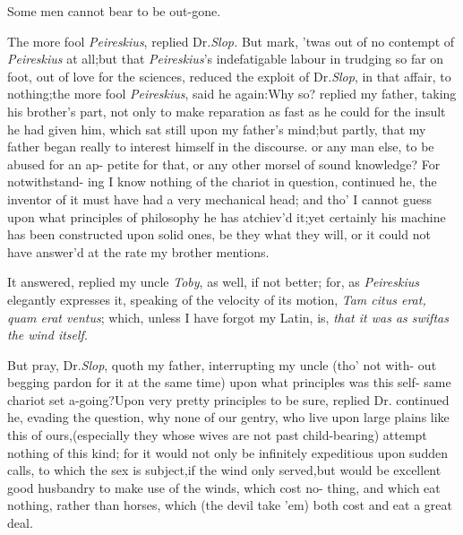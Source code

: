 \documentclass{article}
\begin{document}
Some men cannot bear to be out-gone.

The more fool \textit{Peireskius}, replied Dr.\@ \textit{Slop.} But
mark, ’twas out of no contempt of \textit{Peireskius} at
all;\tsh but that \textit{Peireskius}’s indefatigable labour in
trudging so far on foot, out of love for the sciences, reduced the
exploit of Dr.\@ \textit{Slop}, in that affair, to nothing;\tsk the
more fool \textit{Peireskius}, said he again:\tsk Why so?\tsk\break
replied my father, taking his brother’s part, not
only to make reparation as fast as he could for the insult he had
given him, which sat still upon my father’s\break
mind;\tsk but partly, that my father began really to
interest himself in the discourse.
or any man else, to be abused for an ap-\pb
petite for that, or any other morsel of
sound knowledge? For notwithstand-\break
ing I know nothing of the chariot in\break
question, continued he, the inventor of it must have had a very mechanical head;\break
and tho’ I cannot guess upon what prin\-ciples of philosophy he has atchiev’d\break
it;\tsh yet certainly his machine has\break
been constructed upon solid ones, be\break
they what they will, or it could not\break
have answer’d at the rate my brother\break
mentions.

It answered, replied my uncle \textit{Toby}, as well, if not better; for, as \textit{Peireskius}
elegantly expresses it, speaking of the velocity of its motion,
\textit{Tam citus erat, quam erat ventus}; which, unless I have
forgot my Latin, is, \textit{that it was as swift\break as the wind
itself}.

\newpage
But pray, Dr.\@ \textit{Slop}, quoth my father,\break
interrupting my uncle (tho’ not with-\break
out begging pardon for it at the same
time) upon what principles was this self-\break
same chariot set a-going?\tsk Upon very pretty principles to be sure, replied
Dr.\break
{}\break
continued he, evading
the question, why none of our gentry, who live upon large plains
like this of ours,\tsk (especially they whose wives are not past
child-bearing) attempt nothing of this kind; for it would not only
be infinitely expeditious upon sudden calls, to which the sex is
subject,\tsk if the wind only served,\tsk but would be
excellent good husbandry to make use of the winds, which cost
no-\break
thing, and which eat nothing, rather\break
than horses, which (the devil take ’em)\break 
both cost and eat a great deal.
\end{document}
